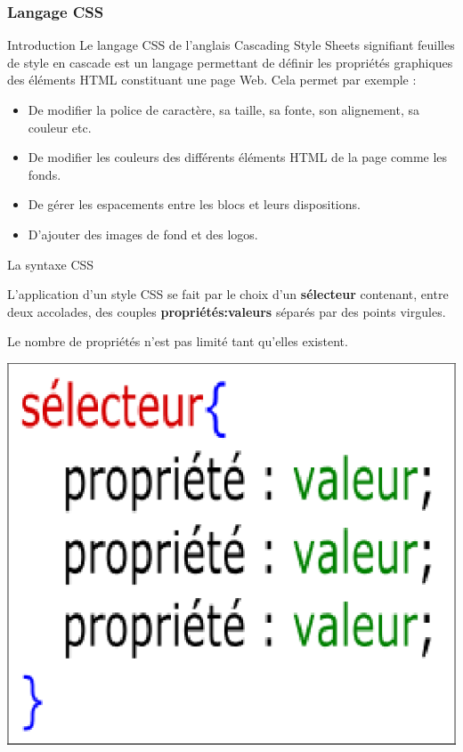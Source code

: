 \documentclass[8pt]{beamer}
\begin{document}
\begin{frame}
\frametitle{Langage CSS}

\begin{block}{Introduction}
Le langage CSS de l'anglais Cascading Style Sheets signifiant feuilles de style en cascade est un langage permettant de définir les propriétés graphiques des éléments HTML constituant une page Web. Cela permet par exemple :

\begin{itemize}
\item De modifier la police de caractère, sa taille, sa fonte, son alignement, sa couleur etc.
\item De modifier les couleurs des différents éléments HTML de la page comme les fonds.
\item De gérer les espacements entre les blocs et leurs dispositions.
\item D'ajouter des images de fond et des logos.
\end{itemize}
\end{block}

\begin{block}{La syntaxe CSS}
\begin{minipage}{0.7\textwidth}
L'application d'un style CSS se fait par le choix d'un \textbf{sélecteur} contenant, entre deux accolades, des couples \textbf{propriétés:valeurs} séparés par des points virgules.\medskip

Le nombre de propriétés n'est pas limité tant qu'elles existent.
\end{minipage}\hfill
\begin{minipage}{0.26\textwidth}
\includegraphics[scale=0.4]{img/selecteurCSS.eps}
\end{minipage}

\end{block}
\end{frame}
\end{document}
